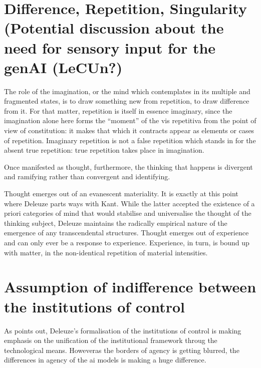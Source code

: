 \section{Difference, Repetition, Singularity (Potential discussion about the
  need for sensory input for the genAI (LeCUn?)}
The role of the imagination, or the mind which contemplates in its multiple and fragmented states, is to draw something new from repetition, to draw difference from it. For that matter, repetition is itself in essence imaginary, since the imagination alone here forms the “moment” of the vis repetitiva from the point of view of constitution: it makes that which it contracts appear as elements or cases of repetition. Imaginary repetition is not a false repetition which stands in for the absent true repetition: true repetition takes place in imagination. \cite{deleuze1994, kruger2021}

Once manifested as thought, furthermore, the thinking that happens is divergent and ramifying rather than convergent and identifying. \cite[175]{kruger2021}

Thought emerges out of an evanescent materiality. It is exactly at this point where Deleuze parts ways with Kant. While the latter accepted the existence of a priori categories of mind that would stabilise and universalise the thought of the thinking subject, Deleuze maintains the radically empirical nature of the emergence of any transcendental structures. Thought emerges out of experience and can only ever be a response to experience. Experience, in turn, is bound up with matter, in the non-identical repetition of material intensities. \cite[178]{kruger2021}


\section{Assumption of indifference between the institutions of control}

As \cite[13]{mackenzie2021} points out, Deleuze's formalisation of the
institutions of control is making emphasis on the unification of the
institutional framework throug the technological means. Howeveras the borders
of agency is getting blurred, the differences in agency of the \gls{ai} models
is making a huge difference.
